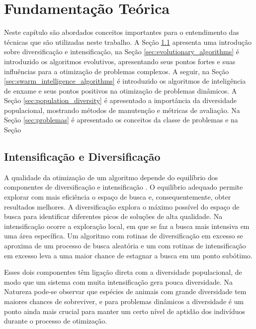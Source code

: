 \chapter{Fundamentação Teórica}
\label{ch:fundamentos}

Neste capítulo são abordados conceitos importantes para o entendimento das técnicas que são utilizadas neste trabalho. A Seção \ref{sec:intesification_diversification} apresenta uma introdução sobre diversificação e intensificação, na Seção \ref{sec:evolutionary_algorithms} é introduzido os algoritmos evolutivos, apresentando seus pontos fortes e suas influências para a otimização de problemas complexos. A seguir, na Seção \ref{sec:swarm_intelligence_algorithms} é introduzido os algoritmos de inteligência de enxame e seus pontos positivos na otimização de problemas dinâmicos. A Seção \ref{sec:population_diversity} é apresentado a importância da diversidade populacional, mostrando métodos de manutenção e métricas de avaliação. Na Seção \ref{sec:problemas} é apresentado os conceitos da classe de problemas e na Seção

\section{Intensificação e Diversificação}
\label{sec:intesification_diversification}

A qualidade da otimização de um algoritmo depende do equilíbrio dos componentes de diversificação e intensificação \cite{vcrepinvsek2013exploration}. O equilíbrio adequado permite explorar com mais eficiência o espaço de busca e, consequentemente, obter resultados melhores. A diversificação explora o máximo possível do espaço de busca para identificar diferentes picos de soluções de alta qualidade. Na intensificação ocorre a exploração local, em que se faz a busca mais intensiva em uma área específica. Um algoritmo com rotinas de diversificação em excesso se aproxima de um processo de busca aleatória e um com rotinas de intensificação em excesso leva a uma maior chance de estagnar a busca em um ponto subótimo.

Esses dois componentes têm ligação direta com a diversidade populacional, de modo que um sistema com muita intensificação gera pouca diversidade. Na Natureza pode-se observar que espécies de animais com grande diversidade tem maiores chances de sobreviver, e para problemas dinâmicos a diversidade é um ponto ainda mais crucial para manter um certo nível de aptidão dos indivíduos durante o processo de otimização.


